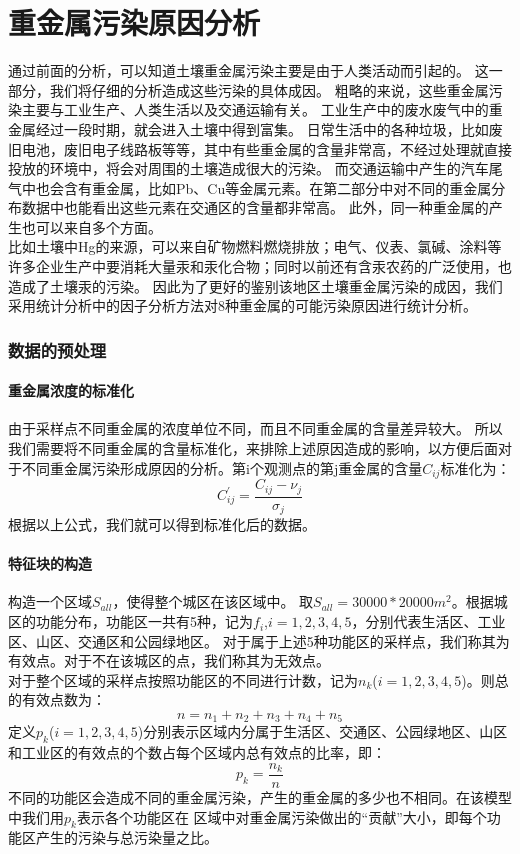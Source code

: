 \documentclass[a4paper]{article}
\begin{document}
\part{重金属污染原因分析}
通过前面的分析，可以知道土壤重金属污染主要是由于人类活动而引起的。
这一部分，我们将仔细的分析造成这些污染的具体成因。
粗略的来说，这些重金属污染主要与工业生产、人类生活以及交通运输有关。
工业生产中的废水废气中的重金属经过一段时期，就会进入土壤中得到富集。
日常生活中的各种垃圾，比如废旧电池，废旧电子线路板等等，其中有些重金属的含量非常高，不经过处理就直接投放的环境中，将会对周围的土壤造成很大的污染。
而交通运输中产生的汽车尾气中也会含有重金属，比如Pb、Cu等金属元素。在第二部分中对不同的重金属分布数据中也能看出这些元素在交通区的含量都非常高。
此外，同一种重金属的产生也可以来自多个方面。               \\
比如土壤中Hg的来源，可以来自矿物燃料燃烧排放；电气、仪表、氯碱、涂料等许多企业生产中要消耗大量汞和汞化合物；同时以前还有含汞农药的广泛使用，也造成了土壤汞的污染。
\indent 因此为了更好的鉴别该地区土壤重金属污染的成因，我们采用统计分析中的因子分析方法对8种重金属的可能污染原因进行统计分析。
\section{数据的预处理}
\subsection{重金属浓度的标准化}
\indent 由于采样点不同重金属的浓度单位不同，而且不同重金属的含量差异较大。
所以我们需要将不同重金属的含量标准化，来排除上述原因造成的影响，以方便后面对于不同重金属污染形成原因的分析。第i个观测点的第j重金属的含量$C_{ij}$标准化为：
\begin{equation}
C_{ij}^{\prime}=\frac{C_{ij}-\nu_{j}}{\sigma_{j}}
\end{equation}
根据以上公式，我们就可以得到标准化后的数据。
\subsection{特征块的构造}
构造一个区域$S_{all}$，使得整个城区在该区域中。
取$S_{all}=30000*20000m^2$。根据城区的功能分布，功能区一共有5种，记为$f_i$,$i=1,2,3,4,5$，分别代表生活区、工业区、山区、交通区和公园绿地区。
对于属于上述5种功能区的采样点，我们称其为有效点。对于不在该城区的点，我们称其为无效点。\\
\indent 对于整个区域的采样点按照功能区的不同进行计数，记为$n_k$($i=1,2,3,4,5$)。则总的有效点数为：
\begin{equation}
n=n_1+n_2+n_3+n_4+n_5
\end{equation}
\indent 定义$p_k$($i=1,2,3,4,5$)分别表示区域内分属于生活区、交通区、公园绿地区、山区和工业区的有效点的个数占每个区域内总有效点的比率，即：
\begin{equation}
p_k=\frac{n_k}{n}
\end{equation}
不同的功能区会造成不同的重金属污染，产生的重金属的多少也不相同。在该模型中我们用$p_k$表示各个功能区在
区域中对重金属污染做出的“贡献”大小，即每个功能区产生的污染与总污染量之比。
\end{document}
